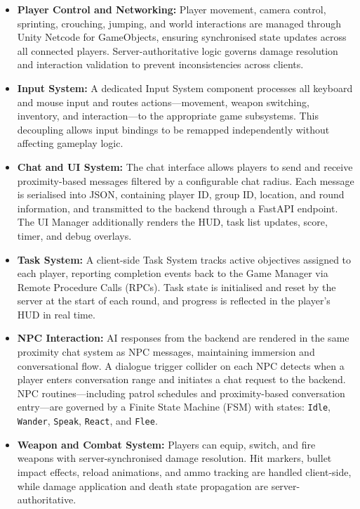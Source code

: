 \begin{itemize}

    \item \textbf{Player Control and Networking:}
    Player movement, camera control, sprinting, crouching, jumping, and world interactions are managed through Unity Netcode for GameObjects, ensuring synchronised state updates across all connected players. Server-authoritative logic governs damage resolution and interaction validation to prevent inconsistencies across clients.

    \item \textbf{Input System:}
    A dedicated Input System component processes all keyboard and mouse input and routes actions---movement, weapon switching, inventory, and interaction---to the appropriate game subsystems. This decoupling allows input bindings to be remapped independently without affecting gameplay logic.

    \item \textbf{Chat and UI System:}
    The chat interface allows players to send and receive proximity-based messages filtered by a configurable chat radius. Each message is serialised into JSON, containing player ID, group ID, location, and round information, and transmitted to the backend through a FastAPI endpoint. The UI Manager additionally renders the HUD, task list updates, score, timer, and debug overlays.

    \item \textbf{Task System:}
    A client-side Task System tracks active objectives assigned to each player, reporting completion events back to the Game Manager via Remote Procedure Calls (RPCs). Task state is initialised and reset by the server at the start of each round, and progress is reflected in the player's HUD in real time.

    \item \textbf{NPC Interaction:}
    AI responses from the backend are rendered in the same proximity chat system as NPC messages, maintaining immersion and conversational flow. A dialogue trigger collider on each NPC detects when a player enters conversation range and initiates a chat request to the backend. NPC routines---including patrol schedules and proximity-based conversation entry---are governed by a Finite State Machine (FSM) with states: \texttt{Idle}, \texttt{Wander}, \texttt{Speak}, \texttt{React}, and \texttt{Flee}.

    \item \textbf{Weapon and Combat System:}
    Players can equip, switch, and fire weapons with server-synchronised damage resolution. Hit markers, bullet impact effects, reload animations, and ammo tracking are handled client-side, while damage application and death state propagation are server-authoritative.


\end{itemize}
